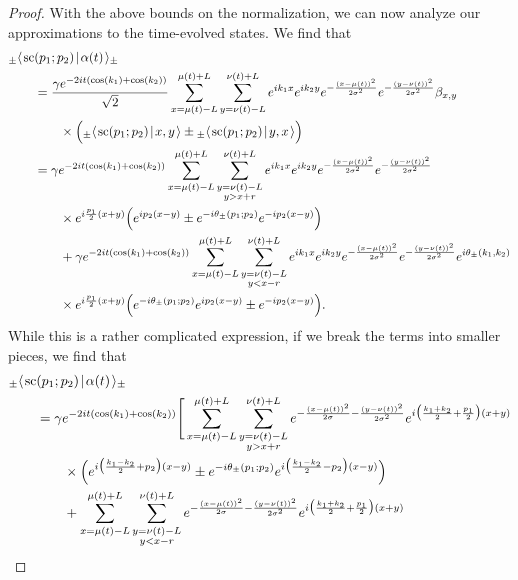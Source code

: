 \documentclass[../thesis-main/thesis-main]{subfiles}
\begin{document}
\begin{proof}
With the above bounds on the normalization, we can now analyze our approximations to the time-evolved states. We find that 
\begin{align}
  &{}_{\pm}\langle\mspace{2mu} \text{sc}(p_1;p_2) \mspace{2mu} | \mspace{2mu} \alpha(t)\mspace{2mu} \rangle_\pm \nonumber\\
  &\qquad= \frac{\gamma e^{-2it(\cos(k_1) + \cos(k_2))}}{\sqrt{2}} \sum_{x= \mu(t) -L}^{\mu(t) + L} \sum_{y=\nu(t) -L}^{\nu(t)+L} e^{i k_1 x} e^{i k_2 y} e^{-\frac{(x-\mu(t))^2}{2\sigma^2}} e^{-\frac{(y-\nu(t))^2}{2\sigma^2}} \beta_{x,y}\nonumber\\
  &\qquad\qquad\times\Big({}_{\pm}\langle\mspace{2mu} \text{sc}(p_1;p_2) \mspace{2mu} | \mspace{2mu} x,y\mspace{2mu} \rangle \pm  {}_{\pm}\langle\mspace{2mu} \text{sc}(p_1;p_2) \mspace{2mu} | \mspace{2mu} y,x\mspace{2mu} \rangle\Big)\\
  &\qquad = \gamma e^{-2it(\cos(k_1) + \cos(k_2))} \sum_{x=\mu(t)-L}^{\mu(t)+L} \sum_{\substack{y=\nu(t)-L\\y > x+r}}^{\nu(t)+L}  e^{i k_1 x} e^{i k_2 y} e^{-\frac{(x-\mu(t))^2}{2\sigma^2}} e^{-\frac{(y-\nu(t))^2}{2\sigma^2}} \nonumber\\
  &\qquad\qquad\times e^{i \frac{p_1}{2} (x+y)}\Big(e^{i p_2 (x-y)} \pm e^{-i\theta_{\pm}(p_1;p_2)} e^{- i p_2 (x-y)}\Big)\nonumber\\
  &\qquad \qquad+ \gamma e^{-2it(\cos(k_1) + \cos(k_2))} \sum_{x=\mu(t)-L}^{\mu(t)+L} \sum_{\substack{y=\nu(t)-L\\y < x-r}}^{\nu(t)+L}  e^{i k_1 x} e^{i k_2 y} e^{-\frac{(x-\mu(t))^2}{2\sigma^2}} e^{-\frac{(y-\nu(t))^2}{2\sigma^2}}e^{i\theta_{\pm}(k_1,k_2)} \nonumber\\
  &\qquad\qquad\times e^{i \frac{p_1}{2} (x+y)}\Big(e^{-i\theta_\pm(p_1;p_2)} e^{i p_2 (x-y)} \pm  e^{- i p_2 (x-y)}\Big).
\end{align}
While this is a rather complicated expression, if we break the terms into smaller pieces, we find that
\begin{align}
  &{}_{\pm}\braket{\scat(p_1;p_2)}{\alpha(t)}_\pm \nonumber\\
  &\qquad = \gamma e^{-2i t (\cos(k_1) + \cos (k_2))}\Bigg[\sum_{x=\mu(t)-L}^{\mu(t)+L} \sum_{\substack{y=\nu(t)-L\\y > x+r}}^{\nu(t)+L} e^{-\frac{(x-\mu(t))^2}{2\sigma} - \frac{(y-\nu(t))^2}{2\sigma^2}} e^{i \big(\frac{k_1 + k_2}{2} +\frac{p_1}{2} \big)(x+y)}\nonumber\\
  &\qquad\qquad \times\Big( e^{i \big(\frac{k_1 - k_2}{2} + p_2 \big) (x-y)} \pm e^{-i\theta_{\pm}(p_1;p_2)} e^{i \big(\frac{k_1-k_2}{2} - p_2 \big)(x-y)} \Big) \nonumber\\
  &\qquad\qquad+\sum_{x=\mu(t)-L}^{\mu(t)+L} \sum_{\substack{y=\nu(t)-L\\y < x-r}}^{\nu(t)+L} e^{-\frac{(x-\mu(t))^2}{2\sigma} - \frac{(y-\nu(t))^2}{2\sigma^2}} e^{i \big(\frac{k_1 + k_2}{2} +\frac{p_1}{2} \big)(x+y)}\nonumber\\

\end{align}
\end{proof}
\end{document}
